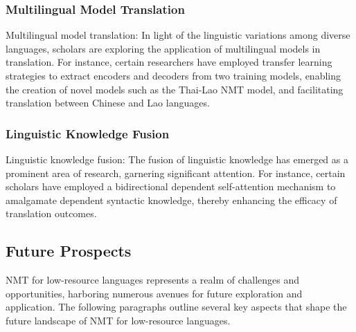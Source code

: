 \documentclass[acmsmall]{acmart}
\begin{document}
\subsubsection{Multilingual Model Translation}
Multilingual model translation: In light of the linguistic variations among diverse languages, scholars are exploring the application of multilingual models in translation. For instance, certain researchers have employed transfer learning strategies to extract encoders and decoders from two training models, enabling the creation of novel models such as the Thai-Lao NMT model, and facilitating translation between Chinese and Lao languages.

\subsubsection{Linguistic Knowledge Fusion}
Linguistic knowledge fusion: The fusion of linguistic knowledge has emerged as a prominent area of research, garnering significant attention. For instance, certain scholars have employed a bidirectional dependent self-attention mechanism to amalgamate dependent syntactic knowledge, thereby enhancing the efficacy of translation outcomes.

\subsection{Future Prospects}
NMT for low-resource languages represents a realm of challenges and opportunities, harboring numerous avenues for future exploration and application. The following paragraphs outline several key aspects that shape the future landscape of NMT for low-resource languages.
\end{document}
